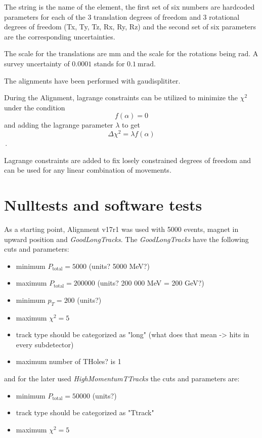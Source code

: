 The string is the name of the element, the first set of six numbers are hardcoded parameters for each of the 3 translation degrees of freedom and 3 rotational degrees of freedom (Tx, Ty, Tz, Rx, Ry, Rz) and the second set of six parameters are the corresponding uncertainties.

The scale for the translations are $\si{\milli\metre}$ and the scale for the rotations being $\si{\radian}$. A survey uncertainty of $\num{0.0001}$ stands for $\SI{0.1}{\milli\radian}$.

The alignments have been performed with gaudisplititer.

During the Alignment, lagrange constraints can be utilized to minimize the
$\chi^2$ under the condition
\begin{equation}
  f(\alpha) = 0
\end{equation}
and adding the lagrange parameter $\lambda$ to get
\begin{equation}
  \Delta \chi^2 = \lambda f(\alpha)
\end{equation}\,.

Lagrange constraints are added to fix losely constrained degrees of freedom and can be used for any linear combination of movements.


\section{Nulltests and software tests}

As a starting point, Alignment v17r1 was used with 5000 events, magnet in upward position and \textit{GoodLongTracks}.
The \textit{GoodLongTracks} have the following cuts and parameters:
\begin{itemize}
  \item minimum $P_{\text{total}} = 5000$ (units? 5000 MeV?)
  \item maximum $P_{\text{total}} = 200 000$ (units? 200 000 MeV = 200 GeV?)
  \item minimum $p_T = 200$ (units?)
  \item maximum $\chi^2 = 5$
  \item track type should be categorized as "long" (what does that mean -> hits in every subdetector)
  \item maximum number of THoles? is 1
\end{itemize}

and for the later used \textit{HighMomentumTTracks} the cuts and parameters are:
\begin{itemize}
  \item minimum $P_{\text{total}} = 50000$ (units?)
  \item track type should be categorized as "Ttrack"
  \item maximum $\chi^2 = 5$
\end{itemize}


